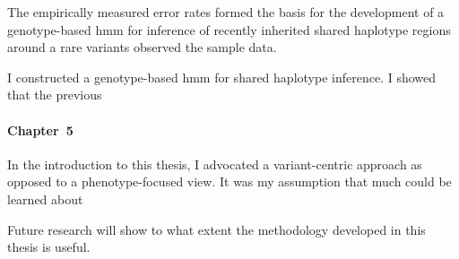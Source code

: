 The empirically measured error rates formed the basis for the development of a genotype-based \gls{hmm} for inference of recently inherited shared haplotype regions around a rare variants observed the sample data.

I constructed a genotype-based \gls{hmm} for shared haplotype inference.
I showed that the previous



\paragraph{Chapter~5}











In the introduction to this thesis, I advocated a variant-centric approach
as opposed to a phenotype-focused view.
It was my assumption that much could be learned about


Future research will show to what extent the methodology developed in this thesis is useful.


\endinput
--






In this thesis, I have demonstrated the value of analysing rare variants to further our understanding of recent human demographic history, in an attempt to contribute to complex disease research.
The unique features of low-frequency and rare variants necessitate the refinement of existing methodologies, yet can yield important results.
While the major findings of this approach have been presented and discussed in detail in the preceding chapters, I use the sections below to briefly summarise the intuition behind the methods developed and their applications.

\Correct{Since I discussed the results and shortcomings of each method developed and analysis conducted \emph{in~situ} per chapter, the following provides a general overview.}



%
\section{Implications for genome-wide association studies}
%

Genotyping methods used in GWA studies are typically designed to probe genetic markers expected to maximise the genetic variation observed between individuals, thereby limiting their capacity to capture and interrogate low-frequency and rare variants.
Imputation from a reference panel is used to predict variants at lower frequencies; however, despite ongoing growth of reference datasets, each panel alone represents only a snapshot of the existing genetic variation in the human genome and, in particular, alleles observed at lower frequencies are more likely to be specific to the cohort or population investigated.

